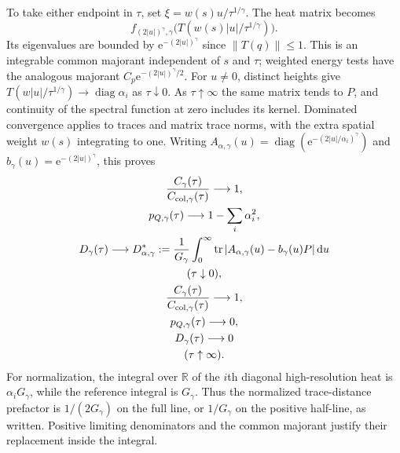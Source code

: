 \documentclass[aps,pra,reprint,superscriptaddress,longbibliography]{revtex4-2}
\newcommand{\dd}{\mathrm d}
\newcommand{\ee}{\mathrm e}
\newcommand{\norm}[1]{\left\lVert#1\right\rVert}
\begin{document}
To take either endpoint in $\tau$, set
$\xi=w(s)u/\tau^{1/\gamma}$.  The heat matrix becomes
\[
 f_{(2|u|)^\gamma,\gamma}
       \bigl(T(w(s)|u|/\tau^{1/\gamma})\bigr).
\]
Its eigenvalues are bounded by $\ee^{-(2|u|)^\gamma}$ since
$\norm{T(q)}\leq1$.  This is an integrable common majorant independent
of $s$ and $\tau$; weighted energy tests have the analogous majorant
$C_p\ee^{-(2|u|)^\gamma/2}$.  For $u\ne0$, distinct heights give
$T(w|u|/\tau^{1/\gamma})\to\operatorname{diag}\alpha_i$ as
$\tau\downarrow0$.  As $\tau\uparrow\infty$ the same matrix tends to
$P$, and continuity of the spectral function at zero includes its
kernel.  Dominated convergence applies to traces and matrix trace
norms, with the extra spatial weight $w(s)$ integrating to one.
Writing
$A_{\alpha,\gamma}(u)=\operatorname{diag}
(\ee^{-(2|u|/\alpha_i)^\gamma})$ and
$b_\gamma(u)=\ee^{-(2|u|)^\gamma}$, this proves
\begin{gather}
 \frac{C_\gamma(\tau)}{C_{\mathrm{col},\gamma}(\tau)}\longrightarrow1,
 \\
p_{Q,\gamma}(\tau)\longrightarrow1-\sum_i\alpha_i^2,
 \notag\\
 D_\gamma(\tau)\longrightarrow
 D^*_{\alpha,\gamma}:=\frac1{G_\gamma}\int_0^\infty
       \operatorname{tr}|A_{\alpha,\gamma}(u)-b_\gamma(u)P|\,\dd u
 \\
(\tau\downarrow0),
 \label{sgt:geo:hot-endpoint}\\
 \frac{C_\gamma(\tau)}{C_{\mathrm{col},\gamma}(\tau)}\longrightarrow1,
 \\
p_{Q,\gamma}(\tau)\longrightarrow0,\\
 D_\gamma(\tau)\longrightarrow0\\
(\tau\uparrow\infty).
 \label{sgt:geo:cold-endpoint}
\end{gather}
For normalization, the integral over $\mathbb R$ of the $i$th
diagonal high-resolution heat is $\alpha_iG_\gamma$, while the
reference integral is $G_\gamma$.  Thus the normalized trace-distance
prefactor is $1/(2G_\gamma)$ on the full line, or $1/G_\gamma$ on the
positive half-line, as written.  Positive limiting denominators and
the common majorant justify their replacement inside the integral.
\end{document}
